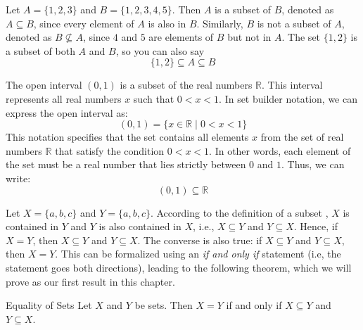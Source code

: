 \begin{example}
\samepage
Let \(A = \{1, 2, 3\}\) and \(B = \{1, 2, 3, 4, 5\}\). Then \(A\) is a subset of \(B\), denoted as \(A \subseteq B\), since every element of \(A\) is also in \(B\).
Similarly, \(B\) is not a subset of \(A\), denoted as \(B \not\subseteq A\), since \(4\) and \(5\) are elements of \(B\) but not in \(A\). The set \(\{1, 2\}\) is a subset of both \(A\) and \(B\), so you can also say 
\[
    \{1, 2\} \subseteq A \subseteq B
\]
\end{example}

\begin{example}
    The open interval \((0, 1)\) is a subset of the real numbers \(\mathbb{R}\). This interval represents all real numbers \(x\) such that \(0 < x < 1\). In set builder notation, we can express the open interval as:
    \[
        (0, 1) = \{x \in \mathbb{R} \mid 0 < x < 1\}
    \]
    This notation specifies that the set contains all elements \(x\) from the set of real numbers \(\mathbb{R}\) that satisfy the condition \(0 < x < 1\). In other words, each element of the set must be a real number that lies strictly between \(0\) and \(1\). Thus, we can write:
    \[
        (0, 1) \subseteq \mathbb{R}
    \]
\end{example}

\begin{example}
Let \(X = \{a, b, c\}\) and \(Y = \{a, b, c\}\). According to the definition of a subset , \(X\) is contained in \(Y\) and \(Y\) is also contained in \(X\), i.e., \(X \subseteq Y\) and \(Y \subseteq X\). Hence, if \(X = Y\), then \(X \subseteq Y\) and \(Y \subseteq X\). The converse is also true: if \(X \subseteq Y\) and \(Y \subseteq X\), then \(X = Y\). This can be formalized using an \textit{if and only if} statement (i.e, the statement goes both directions), leading to the following theorem, which we will prove as our first result in this chapter.
\end{example}

\begin{theorembox}{Equality of Sets}
    Let \(X\) and \(Y\) be sets. Then \(X = Y\) if and only if \(X \subseteq Y\) and \(Y \subseteq X\).
\end{theorembox}

